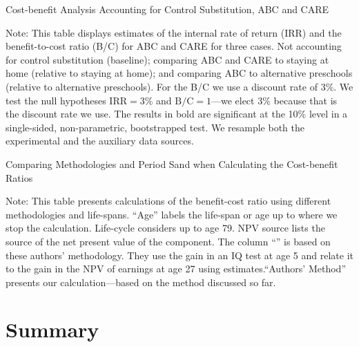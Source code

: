 \begin{table}[H]
\begin{threeparttable}
\caption{Cost-benefit Analysis Accounting for Control Substitution, ABC and CARE}
\label{table:cbacs}
\centering

\begin{tablenotes}
\item Note: This table displays estimates of the internal rate of return (IRR) and the benefit-to-cost ratio (B/C) for ABC and CARE for three cases. Not accounting for control substitution (baseline); comparing ABC and CARE to staying at home (relative to staying at home); and comparing ABC to alternative preschools (relative to alternative preschools). For the B/C we use a discount rate of $3\%$. We test the null hypotheses $\text{IRR} = 3\%$ and $\text{B/C} = 1$---we elect $3\%$ because that is the discount rate we use. The results in bold are significant at the 10\% level in a single-sided, non-parametric, bootstrapped test. We resample both the experimental and the auxiliary data sources.
\end{tablenotes}
\end{threeparttable}
\end{table}

\begin{table}[H]
\begin{threeparttable}
\caption{Comparing Methodologies and Period Sand when Calculating the Cost-benefit Ratios}
\label{table:comparing}
\centering

\begin{tablenotes}
\item Note: This table presents calculations of the benefit-cost ratio using different methodologies and life-spans. ``Age'' labels the life-span or age up to where we stop the calculation. Life-cycle considers up to age 79. NPV source lists the source of the net present value of the component. The column ``\citet{Kline-Walters_2016_QJE}'' is based on these authors’ methodology. They use the gain in an IQ test at age 5 and relate it to the gain in the NPV of earnings at age 27 using \citet{Chetty_Friedman_etal_2010_HowDoesYour} estimates.``Authors’ Method” presents our calculation---based on the method discussed so far.
\end{tablenotes}
\end{threeparttable}
\end{table}


\section{Summary} \label{section:conclusion}

